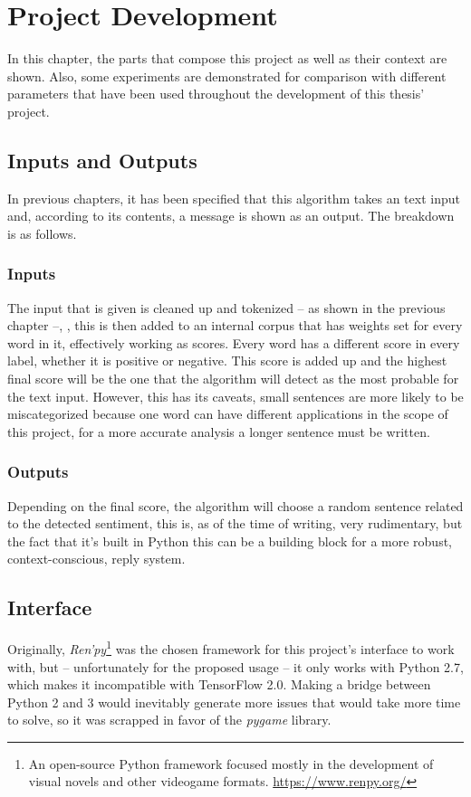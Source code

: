 \chapter{Project Development}
In this chapter, the parts that compose this project as well as their context are shown. Also, some experiments are demonstrated for comparison with different parameters that have been used throughout the development of this thesis' project.

\section{Inputs and Outputs}
In previous chapters, it has been specified that this algorithm takes an text input and, according to its contents, a message is shown as an output. The breakdown is as follows.
\subsection{Inputs}
The input that is given is cleaned up and tokenized -- as shown in the previous chapter --, , this is then added to an internal corpus that has weights set for every word in it, effectively working as scores. Every word has a different score in every label, whether it is positive or negative. This score is added up and the highest final score will be the one that the algorithm will detect as the most probable for the text input. However, this has its caveats, small sentences are more likely to be miscategorized because one word can have different applications in the scope of this project, for a more accurate analysis a longer sentence must be written.
\subsection{Outputs}
Depending on the final score, the algorithm will choose a random sentence related to the detected sentiment, this is, as of the time of writing, very rudimentary, but the fact that it's built in Python this can be a building block for a more robust, context-conscious, reply system.

\section{Interface}
Originally, \textit{Ren'py}\footnote{An open-source Python framework focused mostly in the development of visual novels and other videogame formats. \url{https://www.renpy.org/}} was the chosen framework for this project's interface to work with, but -- unfortunately for the proposed usage -- it only works with Python 2.7, which makes it incompatible with TensorFlow 2.0. Making a bridge between Python 2 and 3 would inevitably generate more issues that would take more time to solve, so it was scrapped in favor of the \textit{pygame} library.
\pagebreak

